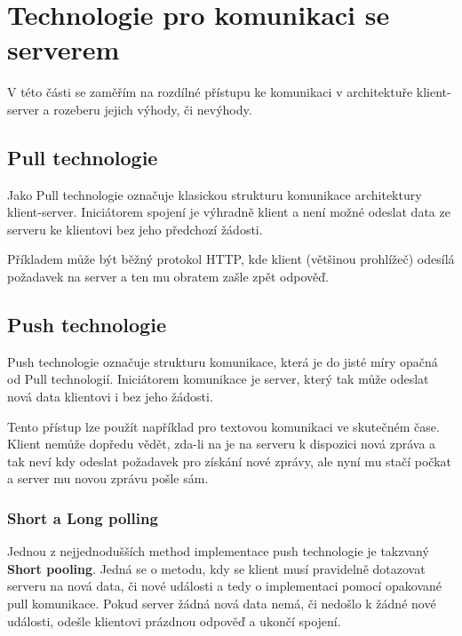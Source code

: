
\section{Technologie pro komunikaci se serverem}\label{sec:technologieProKomunikaciSeServerem}

V této části se zaměřím na rozdílné přístupu ke komunikaci v architektuře klient-server a rozeberu jejich výhody, či nevýhody.

\subsection{Pull technologie}\label{subsec:pullTechnologie}

Jako Pull technologie označuje klasickou strukturu komunikace architektury klient-server.
Iniciátorem spojení je výhradně klient a není možné odeslat data ze serveru ke klientovi bez jeho předchozí žádosti.

Příkladem může být běžný protokol \gls{HTTP}, kde klient (většinou prohlížeč) odesílá požadavek na server a ten mu obratem zašle zpět odpověď.~\cite{pushpull:about}

\subsection{Push technologie}\label{subsec:pushTechnologie}

Push technologie označuje strukturu komunikace, která je do jisté míry opačná od Pull technologií.
Iniciátorem komunikace je server, který tak může odeslat nová data klientovi i bez jeho žádosti.

Tento přístup lze použít například pro textovou komunikaci ve skutečném čase.
Klient nemůže dopředu vědět, zda-li na je na serveru k dispozici nová zpráva a tak neví kdy odeslat požadavek pro získání nové zprávy, ale nyní mu stačí počkat a server mu novou zprávu pošle sám.~\cite{pushpull:about}

\subsubsection{Short a Long polling}

Jednou z nejjednodušších method implementace push technologie je takzvaný \textbf{Short pooling}.
Jedná se o metodu, kdy se klient musí pravidelně dotazovat serveru na nová data, či nové události a tedy o implementaci pomocí opakované pull komunikace.
Pokud server žádná nová data nemá, či nedošlo k žádné nové události, odešle klientovi prázdnou odpověď a ukončí spojení.

